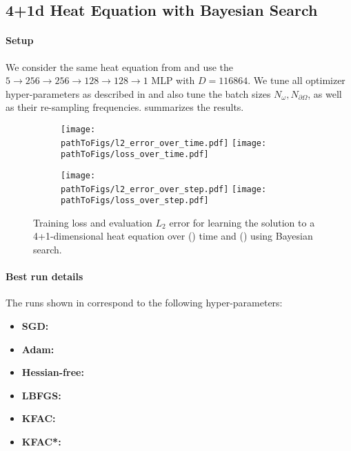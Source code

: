 \subsection{4+1d Heat Equation with Bayesian Search}\label{sec:4d-heat-bayes-app}

\paragraph{Setup} We consider the same heat equation from  and use the $5 \to 256 \to 256\to 128 \to 128 \to 1$ MLP with $D=\num{116864}$.
We tune all optimizer hyper-parameters as described in  and also tune the batch sizes $N_{\omega}, N_{\partial \Omega}$, as well as their re-sampling frequencies.
 summarizes the results.

\begin{figure}[!h]
  \centering
  \def\pathToFigs{../kfac_pinns_exp/exp31_heat4d_mlp_tanh_256_bayes}
  \begin{subfigure}[t]{1.0\linewidth}
    \caption{}\label{subfig:heat4d-bayes-time}
    \texttt{[image: \\pathToFigs/l2\_error\_over\_time.pdf]}
    \texttt{[image: \\pathToFigs/loss\_over\_time.pdf]}
  \end{subfigure}
  \begin{subfigure}[t]{1.0\linewidth}
    \caption{}\label{subfig:heat4d-bayes-step}
    \texttt{[image: \\pathToFigs/l2\_error\_over\_step.pdf]}
    \texttt{[image: \\pathToFigs/loss\_over\_step.pdf]}
  \end{subfigure}
  \caption{Training loss and evaluation $L_2$ error for learning the solution to a 4+1-dimensional heat equation over () time and () using Bayesian search.}\label{fig:heat4d-bayes-appendix}
\end{figure}

\paragraph{Best run details}
The runs shown in  correspond to the following hyper-parameters:
\begin{itemize}
  \def\pathToRuns{../kfac_pinns_exp/exp31_heat4d_mlp_tanh_256_bayes/tex/}
\item \textbf{SGD:} 
\item \textbf{Adam:} 
\item \textbf{Hessian-free:} 
\item \textbf{LBFGS:} 
\item \textbf{KFAC:} 
\item \textbf{KFAC*:} 
\end{itemize}

